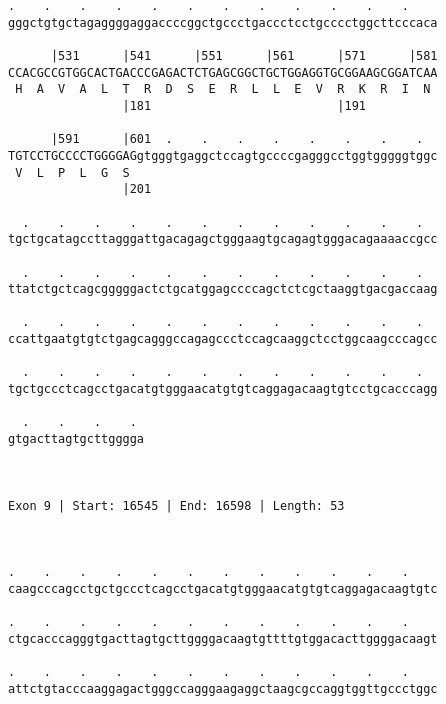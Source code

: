 \documentclass{article}
\begin{document}
\begin{Verbatim}
.    .    .    .    .    .    .    .    .    .    .    .    
gggctgtgctagaggggaggaccccggctgccctgaccctcctgcccctggcttcccaca
                                                            
      |531      |541      |551      |561      |571      |581
CCACGCCGTGGCACTGACCCGAGACTCTGAGCGGCTGCTGGAGGTGCGGAAGCGGATCAA
 H  A  V  A  L  T  R  D  S  E  R  L  L  E  V  R  K  R  I  N 
                |181                          |191          
  
      |591      |601  .    .    .    .    .    .    .    .  
TGTCCTGCCCCTGGGGAGgtgggtgaggctccagtgccccgagggcctggtgggggtggc
 V  L  P  L  G  S                                           
                |201                                        
  
  .    .    .    .    .    .    .    .    .    .    .    .  
tgctgcatagccttagggattgacagagctgggaagtgcagagtgggacagaaaaccgcc
                                                            
  .    .    .    .    .    .    .    .    .    .    .    .  
ttatctgctcagcgggggactctgcatggagccccagctctcgctaaggtgacgaccaag
                                                            
  .    .    .    .    .    .    .    .    .    .    .    .  
ccattgaatgtgtctgagcagggccagagccctccagcaaggctcctggcaagcccagcc
                                                            
  .    .    .    .    .    .    .    .    .    .    .    .  
tgctgccctcagcctgacatgtgggaacatgtgtcaggagacaagtgtcctgcacccagg
                                                            
  .    .    .    . 
gtgacttagtgcttgggga
                   
                   
 
Exon 9 | Start: 16545 | End: 16598 | Length: 53



.    .    .    .    .    .    .    .    .    .    .    .    
caagcccagcctgctgccctcagcctgacatgtgggaacatgtgtcaggagacaagtgtc
                                                            
.    .    .    .    .    .    .    .    .    .    .    .    
ctgcacccagggtgacttagtgcttggggacaagtgttttgtggacacttggggacaagt
                                                            
.    .    .    .    .    .    .    .    .    .    .    .    
attctgtacccaaggagactgggccagggaagaggctaagcgccaggtggttgccctggc
                                                            

\end{Verbatim}
\end{document}
